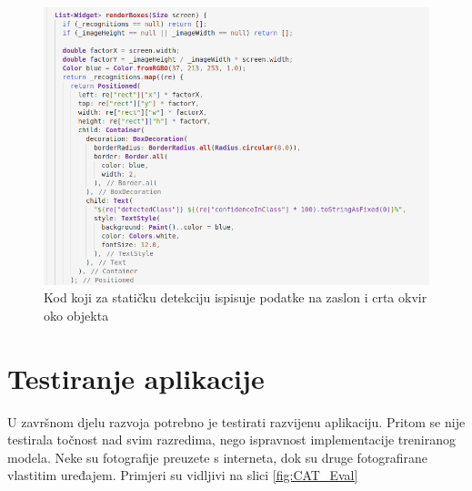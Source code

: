 \begin{figure}[htb]
    \centering
    \includegraphics[width=14cm]{img/Flutter-render-boxes.png}
    \caption{Kod koji za statičku detekciju ispisuje podatke na zaslon i crta okvir oko objekta}
    \label{Flutter-render-boxes}
\end{figure}

\section{Testiranje aplikacije}
U završnom djelu razvoja potrebno je testirati razvijenu aplikaciju. Pritom se nije testirala točnost nad svim razredima, nego ispravnost implementacije treniranog modela.
Neke su fotografije preuzete s interneta, dok su druge fotografirane vlastitim uređajem. Primjeri su vidljivi na slici \ref{fig:CAT_Eval}


